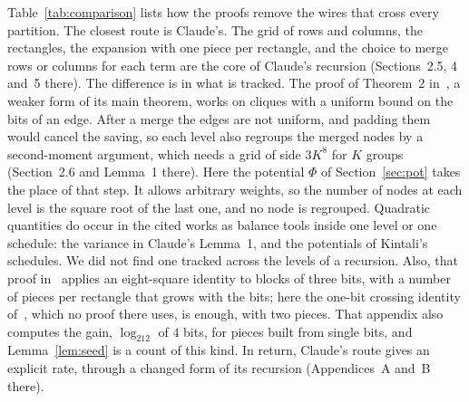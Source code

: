 \documentclass[11pt]{article}
\begin{document}
Table~\ref{tab:comparison} lists how the proofs remove the wires that cross every partition. The closest route is Claude's. The grid of rows and columns, the rectangles, the expansion with one piece per rectangle, and the choice to merge rows or columns for each term are the core of Claude's recursion (Sections~2.5, 4 and~5 there). The difference is in what is tracked. The proof of Theorem~2 in~\cite{Cla26}, a weaker form of its main theorem, works on cliques with a uniform bound on the bits of an edge. After a merge the edges are not uniform, and padding them would cancel the saving, so each level also regroups the merged nodes by a second-moment argument, which needs a grid of side $3K^8$ for $K$ groups (Section~2.6 and Lemma~1 there). Here the potential $\Phi$ of Section~\ref{sec:pot} takes the place of that step. It allows arbitrary weights, so the number of nodes at each level is the square root of the last one, and no node is regrouped. Quadratic quantities do occur in the cited works as balance tools inside one level or one schedule: the variance in Claude's Lemma~1, and the potentials of Kintali's schedules. We did not find one tracked across the levels of a recursion. Also, that proof in~\cite{Cla26} applies an eight-square identity to blocks of three bits, with a number of pieces per rectangle that grows with the bits; here the one-bit crossing identity of~\cite[Appendix~H]{Cla26}, which no proof there uses, is enough, with two pieces. That appendix also computes the gain, $\log_212$ of $4$ bits, for pieces built from single bits, and Lemma~\ref{lem:seed} is a count of this kind. In return, Claude's route gives an explicit rate, through a changed form of its recursion (Appendices~A and~B there).

\begin{table}[ht]
\centering
\small
{}
\caption{Where the proofs differ. For Appendix~D of~\cite{OAI26} we read the overview and the headings.}\label{tab:comparison}
\end{table}
\end{document}
